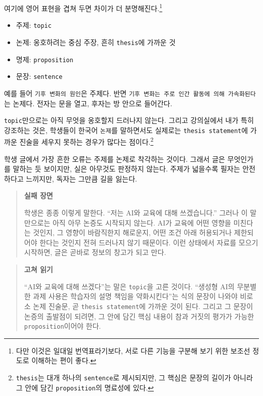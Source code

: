 여기에 영어 표현을 겹쳐 두면 차이가 더 분명해진다.\footnote{다만 이것은 일대일 번역표라기보다, 서로 다른 기능을 구분해 보기 위한 보조선 정도로 이해하는 편이 좋다.}

\begin{itemize}
\tightlist
\item
  주제: \texttt{topic}
\item
  논제: 옹호하려는 중심 주장, 흔히 \texttt{thesis}에 가까운 것
\item
  명제: \texttt{proposition}
\item
  문장: \texttt{sentence}
\end{itemize}

예를 들어 \texttt{기후\ 변화의\ 원인}은 주제다. 반면 \texttt{기후\ 변화는\ 주로\ 인간\ 활동에\ 의해\ 가속화된다}는 논제다. 전자는 문을 열고, 후자는 방 안으로 들어간다.

\texttt{topic}만으로는 아직 무엇을 옹호할지 드러나지 않는다. 그리고 강의실에서 내가 특히 강조하는 것은, 학생들이 한국어 \texttt{논제}를 말하면서도 실제로는 \texttt{thesis\ statement}에 가까운 진술을 세우지 못하는 경우가 많다는 점이다.\footnote{\texttt{thesis}는 대개 하나의 \texttt{sentence}로 제시되지만, 그 핵심은 문장의 길이가 아니라 그 안에 담긴 \texttt{proposition}의 명료성에 있다.}

학생 글에서 가장 흔한 오류는 주제를 논제로 착각하는 것이다. 그래서 글은 무엇인가를 말하는 듯 보이지만, 실은 아무것도 판정하지 않는다. 주제가 넓을수록 필자는 안전하다고 느끼지만, 독자는 그만큼 길을 잃는다.

\begin{quote}
\textbf{실패 장면}

학생은 종종 이렇게 말한다. ``저는 AI와 교육에 대해 쓰겠습니다.'' 그러나 이 말만으로는 아직 아무 논증도 시작되지 않는다. AI가 교육에 어떤 영향을 미친다는 것인지, 그 영향이 바람직한지 해로운지, 어떤 조건 아래 허용되거나 제한되어야 한다는 것인지 전혀 드러나지 않기 때문이다. 이런 상태에서 자료를 모으기 시작하면, 글은 곧바로 정보의 창고가 되고 만다.
\end{quote}

\begin{quote}
\textbf{고쳐 읽기}

``AI와 교육에 대해 쓰겠다''는 말은 \texttt{topic}을 고른 것이다. ``생성형 AI의 무분별한 과제 사용은 학습자의 설명 책임을 약화시킨다''는 식의 문장이 나와야 비로소 논제 진술문, 곧 \texttt{thesis\ statement}에 가까운 것이 된다. 그리고 그 문장이 논증의 출발점이 되려면, 그 안에 담긴 핵심 내용이 참과 거짓의 평가가 가능한 \texttt{proposition}이어야 한다.
\end{quote}

